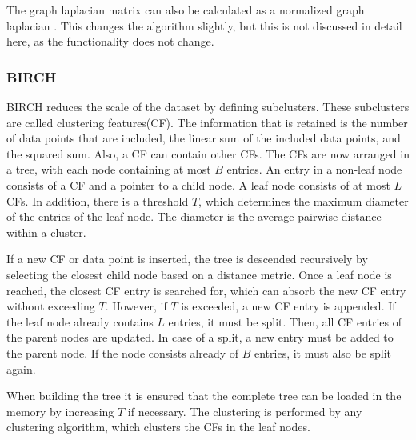 The graph laplacian matrix can also be calculated as a normalized graph laplacian \cite{spectral_clustering}.
This changes the algorithm slightly, but this is not discussed in detail here, as the functionality does not change.

\subsubsection{BIRCH}
BIRCH reduces the scale of the dataset by defining subclusters.
These subclusters are called clustering features(CF).
The information that is retained is the number of data points that are included, the linear sum of the included data points, and the squared sum.
Also, a CF can contain other CFs.
The CFs are now arranged in a tree, with each node containing at most $B$ entries.
An entry in a non-leaf node consists of a CF and a pointer to a child node.
A leaf node consists of at most $L$ CFs.
In addition, there is a threshold $T$, which determines the maximum diameter of the entries of the leaf node.
The diameter is the average pairwise distance within a cluster.

If a new CF or data point is inserted, the tree is descended recursively by selecting the closest child node based on a distance metric.
Once a leaf node is reached, the closest CF entry is searched for, which can absorb the new CF entry without exceeding $T$.
However, if $T$ is exceeded, a new CF entry is appended.
If the leaf node already contains $L$ entries, it must be split.
Then, all CF entries of the parent nodes are updated.
In case of a split, a new entry must be added to the parent node.
If the node consists already of $B$ entries, it must also be split again.

When building the tree it is ensured that the complete tree can be loaded in the memory by increasing $T$ if necessary.
The clustering is performed by any clustering algorithm, which clusters the CFs in the leaf nodes.\cite{birch}